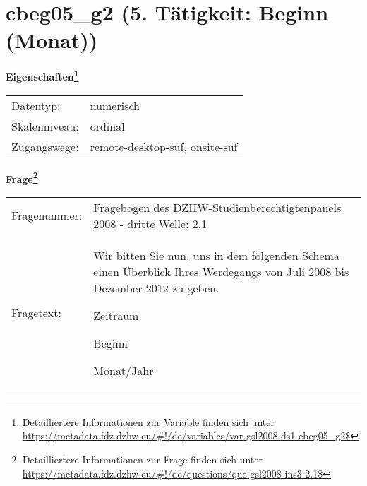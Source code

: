 
    \setcounter{footnote}{0}

    \vspace*{-1.8cm}
	\section{cbeg05\_g2 (5. Tätigkeit: Beginn (Monat))}
	\label{section:cbeg05_g2}



    \vspace*{0.5cm}
    \noindent\textbf{Eigenschaften\footnote{Detailliertere Informationen zur Variable finden sich unter
		\url{https://metadata.fdz.dzhw.eu/\#!/de/variables/var-gsl2008-ds1-cbeg05_g2$}}}\\
	\begin{tabularx}{\hsize}{@{}lX}
	Datentyp: & numerisch \\
	Skalenniveau: & ordinal \\
	Zugangswege: &
	  remote-desktop-suf, 
	  onsite-suf
 \\
    \end{tabularx}



				\vspace*{0.5cm}
                \noindent\textbf{Frage\footnote{Detailliertere Informationen zur Frage finden sich unter
		              \url{https://metadata.fdz.dzhw.eu/\#!/de/questions/que-gsl2008-ins3-2.1$}}}\\
				\begin{tabularx}{\hsize}{@{}lX}
					Fragenummer: &
					  Fragebogen des DZHW-Studienberechtigtenpanels 2008 - dritte Welle:
					  2.1
 \\
					Fragetext: & Wir bitten Sie nun, uns in dem folgenden Schema einen Überblick Ihres Werdegangs von Juli 2008 bis Dezember 2012 zu geben.\par  Zeitraum\par  Beginn\par  Monat/Jahr \\
				\end{tabularx}





